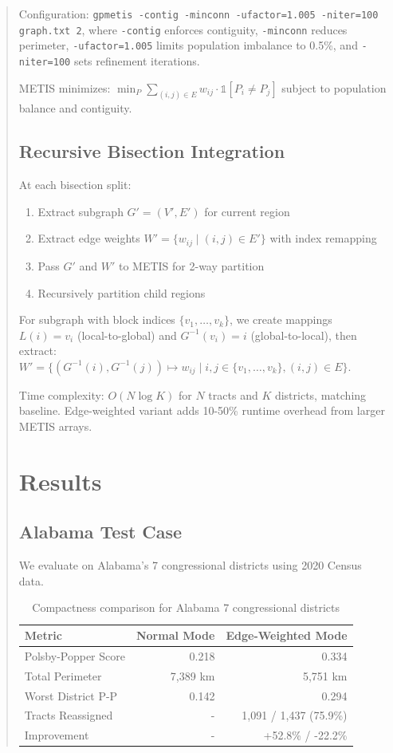 \documentclass[11pt,twocolumn]{article}
\begin{document}
\begin{abstract}
Configuration: \texttt{gpmetis -contig -minconn -ufactor=1.005 -niter=100 graph.txt 2}, where \texttt{-contig} enforces contiguity, \texttt{-minconn} reduces perimeter, \texttt{-ufactor=1.005} limits population imbalance to 0.5\%, and \texttt{-niter=100} sets refinement iterations.

METIS minimizes: $\min_{P} \sum_{(i,j) \in E} w_{ij} \cdot \mathbb{1}[P_i \neq P_j]$ subject to population balance and contiguity.

\subsection{Recursive Bisection Integration}

At each bisection split:
\begin{enumerate}
\item Extract subgraph $G' = (V', E')$ for current region
\item Extract edge weights $W' = \{w_{ij} \mid (i,j) \in E'\}$ with index remapping
\item Pass $G'$ and $W'$ to METIS for 2-way partition
\item Recursively partition child regions
\end{enumerate}

For subgraph with block indices $\{v_1, \ldots, v_k\}$, we create mappings $L(i) = v_i$ (local-to-global) and $G^{-1}(v_i) = i$ (global-to-local), then extract: $W' = \{(G^{-1}(i), G^{-1}(j)) \mapsto w_{ij} \mid i,j \in \{v_1, \ldots, v_k\}, (i,j) \in E\}$.

Time complexity: $O(N \log K)$ for $N$ tracts and $K$ districts, matching baseline. Edge-weighted variant adds 10-50\% runtime overhead from larger METIS arrays.

\section{Results}

\subsection{Alabama Test Case}

We evaluate on Alabama's 7 congressional districts using 2020 Census data.

\begin{table}[h]
\centering
\begin{tabular}{lrr}
\toprule
Metric & Normal Mode & Edge-Weighted Mode \\
\midrule
Polsby-Popper Score & 0.218 & 0.334 \\
Total Perimeter & 7,389 km & 5,751 km \\
Worst District P-P & 0.142 & 0.294 \\
Tracts Reassigned & - & 1,091 / 1,437 (75.9\%) \\
\midrule
Improvement & - & +52.8\% / -22.2\% \\
\bottomrule
\end{tabular}
\caption{Compactness comparison for Alabama 7 congressional districts}
\end{table}


\end{abstract}
\end{document}
